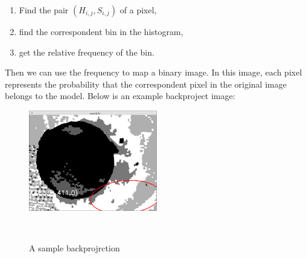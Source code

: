 \begin{enumerate}
  \item Find the pair $(H_{i,j},S_{i,j})$ of a pixel,
  \item find the correspondent bin in the histogram,
  \item get the relative frequency of the bin. 
\end{enumerate}
Then we can use the frequency to map a binary image. In this image, each pixel represents the probability that the correspondent pixel in the original image belongs to the model. Below is an example backproject image:\\
\begin{figure}[h!]
  
  \centering
    \includegraphics[width=0.5\textwidth]{./Pictures/backproject.png}
    \caption{A sample backprojrction}\\
\end{figure}
